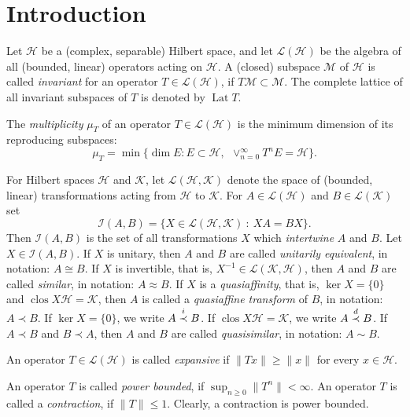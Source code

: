 \documentclass[a4paper,oneside,11pt]{amsart}
\numberwithin{equation}{section}
\theoremstyle{plain}
\theoremstyle{definition}
\begin{document}
\section{Introduction}

 Let $\mathcal H$ be a (complex, separable) Hilbert space, 
and let  $\mathcal L(\mathcal H)$ be the algebra of all (bounded, linear)  operators acting on  $\mathcal H$. A (closed) subspace  $\mathcal M$ of  $\mathcal H$ is called \emph{invariant} 
for an operator $T\in\mathcal L(\mathcal H)$, if $T\mathcal M\subset\mathcal M$.
 The complete lattice of all invariant subspaces of $T$ is denoted by  $\operatorname{Lat}T$. 

The \emph{multiplicity} $\mu_T$ of an operator  $T\in \mathcal L(\mathcal H)$ 
 is the minimum dimension of its reproducing subspaces: 
\begin{equation}\label{mu}  \mu_T=\min\{\dim E: E\subset \mathcal H, \ \ 
\vee_{n=0}^\infty T^n E=\mathcal H \}.\end{equation}

For Hilbert spaces  $\mathcal H$ and $\mathcal K$, let    $\mathcal L(\mathcal H, \mathcal K)$ denote the space of (bounded, linear) 
transformations acting from $\mathcal H$ to $\mathcal K$.
For $A\in\mathcal L(\mathcal H)$ and  $B\in\mathcal L(\mathcal K)$ 
set
\begin{equation*}
\mathcal I(A,B)=\{X\in\mathcal L(\mathcal H, \mathcal K)\ :\ XA=BX\}.
\end{equation*} 
Then $\mathcal I(A,B)$ is the set of all transformations $X$ which  \emph{intertwine} $A$ and $B$.
Let $X\in\mathcal I(A,B)$.  
If $X$ is unitary, then $A$ and $B$ 
are called  \emph{unitarily equivalent}, in notation: $A\cong B$. If $X$ is invertible, that is, $X^{-1}\in\mathcal L(\mathcal K, \mathcal H)$, 
then $A$ and $B$ are called \emph{similar}, in notation: $A\approx B$.
If $X$ is a \emph{quasiaffinity}, that is, $\ker X=\{0\}$ and $\operatorname{clos}X\mathcal H=\mathcal K$, then
$A$ is called a  \emph{quasiaffine transform} of $B$, in notation: $A\prec B$. 
If  $\ker X=\{0\}$, we write $A\buildrel i \over\prec B$. 
If  $\operatorname{clos}X\mathcal H=\mathcal K$, we write $A\buildrel d \over\prec B$. 
If $A\prec B$ and 
$B\prec A$, then $A$ and $B$ are called  \emph{quasisimilar}, in notation: $A\sim B$. 

An operator $T\in\mathcal L(\mathcal H)$ is called \emph{expansive} if $\|Tx\|\geq\|x\|$ for every $x\in \mathcal H$. 

An  operator $T$ is called  \emph{power bounded}, if $\sup_{n\geq 0}\|T^n\| < \infty$.
 An  operator $T$  is called a  \emph{contraction}, if $\|T\|\leq 1$. 
Clearly, a contraction is power bounded.
\end{document}
